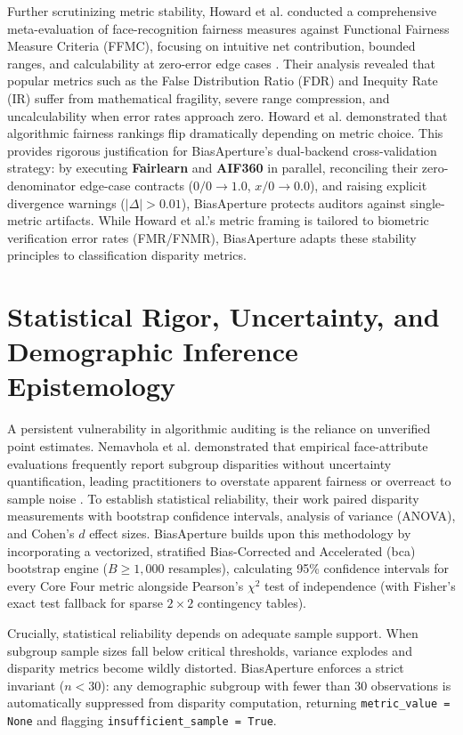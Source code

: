 Further scrutinizing metric stability, Howard et al. conducted a comprehensive meta-evaluation of face-recognition fairness measures against Functional Fairness Measure Criteria (FFMC), focusing on intuitive net contribution, bounded ranges, and calculability at zero-error edge cases \cite{howard2022evaluating}. Their analysis revealed that popular metrics such as the False Distribution Ratio (FDR) and Inequity Rate (IR) suffer from mathematical fragility, severe range compression, and uncalculability when error rates approach zero. Howard et al. demonstrated that algorithmic fairness rankings flip dramatically depending on metric choice. This provides rigorous justification for BiasAperture's dual-backend cross-validation strategy: by executing \textbf{Fairlearn} and \textbf{AIF360} in parallel, reconciling their zero-denominator edge-case contracts ($0/0 \to 1.0$, $x/0 \to 0.0$), and raising explicit divergence warnings ($|\Delta| > 0.01$), BiasAperture protects auditors against single-metric artifacts. While Howard et al.'s metric framing is tailored to biometric verification error rates (FMR/FNMR), BiasAperture adapts these stability principles to classification disparity metrics.


\section{Statistical Rigor, Uncertainty, and Demographic Inference Epistemology}
\label{sec:lit_statistics}

A persistent vulnerability in algorithmic auditing is the reliance on unverified point estimates. Nemavhola et al. demonstrated that empirical face-attribute evaluations frequently report subgroup disparities without uncertainty quantification, leading practitioners to overstate apparent fairness or overreact to sample noise \cite{nemavhola2026reassessing}. To establish statistical reliability, their work paired disparity measurements with bootstrap confidence intervals, analysis of variance (ANOVA), and Cohen's $d$ effect sizes. BiasAperture builds upon this methodology by incorporating a vectorized, stratified Bias-Corrected and Accelerated (\gls{bca}) bootstrap engine ($B \ge 1,000$ resamples), calculating 95\% confidence intervals for every Core Four metric alongside Pearson's $\chi^2$ test of independence (with Fisher's exact test fallback for sparse $2 \times 2$ contingency tables).

Crucially, statistical reliability depends on adequate sample support. When subgroup sample sizes fall below critical thresholds, variance explodes and disparity metrics become wildly distorted. BiasAperture enforces a strict invariant ($n < 30$): any demographic subgroup with fewer than 30 observations is automatically suppressed from disparity computation, returning \texttt{metric\_value = None} and flagging \texttt{insufficient\_sample = True}.

